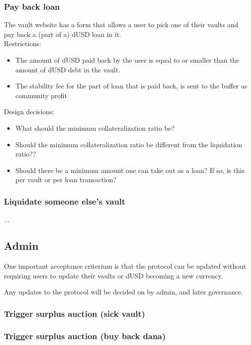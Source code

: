 \documentclass{article} %
\begin{document}
\subsubsection{Pay back loan}

The vault website has a form that allows a user to pick one of their vaults and
pay back a (part of a) dUSD loan in it. \\

Restrictions:
\begin{itemize}
  \item The amount of dUSD paid back by the user is equal to or smaller than the
    amount of dUSD debt in the vault.
  \item The stability fee for the part of loan that is paid back, is sent to the
    buffer as community profit
\end{itemize}

Design decisions:
\begin{itemize}
  \item What should the minimum collateralization ratio be?
  \item Should the minimum collateralization ratio be different from the
    liquidation ratio??
  \item Should there be a minimum amount one can take out as a loan? If so, is
    this per vault or per loan transaction?
\end{itemize}

\subsubsection{Liquidate someone else's vault}

...

\subsection{Admin}

One important acceptance criterium is that the protocol can be updated without
requiring users to update their vaults or dUSD becoming a new currency.

Any updates to the protocol will be decided on by admin, and later governance.

\subsubsection{Trigger surplus auction (sick vault)}

\subsubsection{Trigger surplus auction (buy back dana)}
\end{document}
